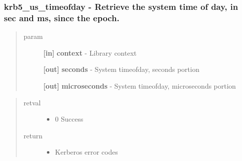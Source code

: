 \documentclass[letterpaper,10pt,english]{sphinxmanual}
\begin{document}
\subsubsection{krb5\_us\_timeofday -  Retrieve the system time of day, in sec and ms, since the epoch.}
\label{appdev/refs/api/krb5_us_timeofday:krb5-us-timeofday-retrieve-the-system-time-of-day-in-sec-and-ms-since-the-epoch}\label{appdev/refs/api/krb5_us_timeofday::doc}

\begin{fulllineitems}
\label{appdev/refs/api/krb5_us_timeofday:c.krb5_us_timeofday}
\end{fulllineitems}

\begin{quote}\begin{description}
\item[{param}] \leavevmode
\textbf{{[}in{]}} \textbf{context} - Library context

\textbf{{[}out{]}} \textbf{seconds} - System timeofday, seconds portion

\textbf{{[}out{]}} \textbf{microseconds} - System timeofday, microseconds portion

\end{description}\end{quote}
\begin{quote}\begin{description}
\item[{retval}] \leavevmode\begin{itemize}
\item {} 
0   Success

\end{itemize}

\item[{return}] \leavevmode\begin{itemize}
\item {} 
Kerberos error codes

\end{itemize}

\end{description}\end{quote}
\end{document}
